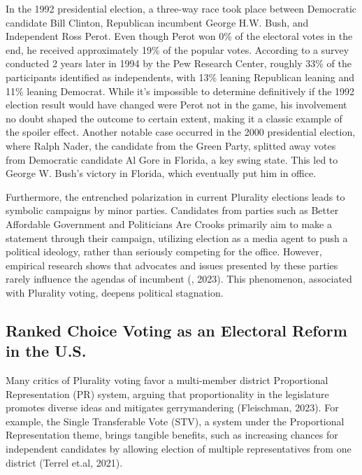 \documentclass[12pt, a4paper, twoside]{article}
\begin{document}
In the 1992 presidential election, a three-way race took place between Democratic candidate Bill Clinton, Republican incumbent George H.W. Bush, and Independent Ross Perot. Even though Perot won 0\% of the electoral votes in the end, he received approximately 19\% of the popular votes. According to a survey conducted 2 years later in 1994 by the Pew Research Center, roughly 33\% of the participants identified as independents, with 13\% leaning Republican leaning and 11\% leaning Democrat. While it’s impossible to determine definitively if the 1992 election result would have changed were Perot not in the game, his involvement no doubt shaped the outcome to certain extent, making it a classic example of the spoiler effect. Another notable case occurred in the 2000 presidential election, where Ralph Nader, the candidate from the Green Party, splitted away votes from Democratic candidate Al Gore in Florida, a key swing state. This led to George W. Bush’s victory in Florida, which eventually put him in office.

Furthermore, the entrenched polarization in current Plurality elections leads to symbolic campaigns by minor parties. Candidates from parties such as Better Affordable Government and Politicians Are Crooks primarily aim to make a statement through their campaign, utilizing election as a media agent to push a political ideology, rather than seriously competing for the office. However, empirical research shows that advocates and issues presented by these parties rarely influence the agendas of incumbent (\cite{klepetar_nodate}, 2023). This phenomenon, associated with Plurality voting, deepens political stagnation. 

\subsection{Ranked Choice Voting as an Electoral Reform in the U.S.}

Many critics of Plurality voting favor a multi-member district Proportional Representation (PR) system, arguing that proportionality in the legislature promotes diverse ideas and mitigates gerrymandering (Fleischman, 2023). For example, the Single Transferable Vote (STV), a system under the Proportional Representation theme, brings tangible benefits, such as increasing chances for independent candidates by allowing election of multiple representatives from one district (Terrel et.al, 2021). 
\end{document}
